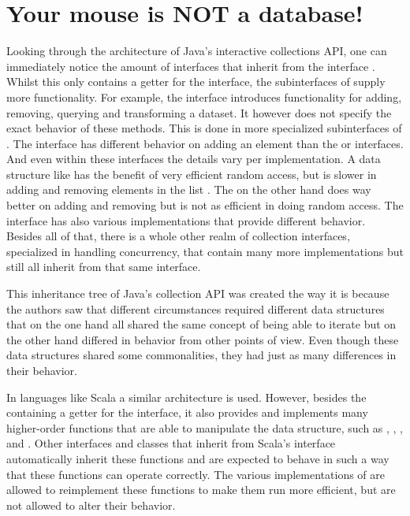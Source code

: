 \section{Your mouse is NOT a database!}
Looking through the architecture of Java's interactive collections API, one can immediately notice the amount of interfaces that inherit from the \itb interface \cite{java-iterable-api}. Whilst this \itb only contains a getter for the \itr interface, the subinterfaces of \itb supply more functionality. For example, the  interface introduces functionality for adding, removing, querying and transforming a dataset. It however does not specify the exact behavior of these methods. This is done in more specialized subinterfaces of . The  interface has different behavior on adding an element than the  or  interfaces. And even within these interfaces the details vary per implementation. A data structure like  has the benefit of very efficient random access, but is slower in adding and removing elements in the list \cite{linkedlist-vs-arraylist}. The  on the other hand does way better on adding and removing but is not as efficient in doing random access. The  interface has also various implementations that provide different behavior. Besides all of that, there is a whole other realm of collection interfaces, specialized in handling concurrency, that contain many more implementations but still all inherit from that same \itb interface.

This inheritance tree of Java's collection API was created the way it is because the authors saw that different circumstances required different data structures that on the one hand all shared the same concept of being able to iterate but on the other hand differed in behavior from other points of view. Even though these data structures shared some commonalities, they had just as many differences in their behavior.

In languages like Scala a similar architecture is used. However, besides the \itb containing a getter for the \itr interface, it also provides and implements many higher-order functions that are able to manipulate the data structure, such as , , ,  and . Other interfaces and classes that inherit from Scala's \itb interface automatically inherit these functions and are expected to behave in such a way that these functions can operate correctly. The various implementations of \itb are allowed to reimplement these functions to make them run more efficient, but are not allowed to alter their behavior.

